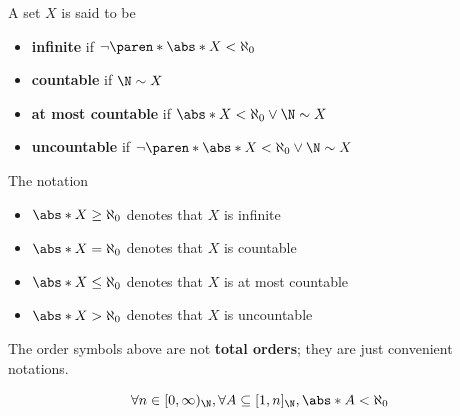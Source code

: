 \begin{definition} \label{an:def:infinite-countable-uncountable-sets}
  A set $X$ is said to be
  \begin{itemize}
    \item \textbf{infinite} if $\neg\paren*{\abs*{X} < \aleph_{0}}$
    \item \textbf{countable} if $\N \sim X$
    \item \textbf{at most countable} if $\abs*{X} < \aleph_{0} \lor \N \sim X$
    \item \textbf{uncountable} if $\neg\paren*{\abs*{X} < \aleph_{0} \lor \N \sim X}$
  \end{itemize}
  The notation
  \begin{itemize}
    \item $\abs*{X} \geq \aleph_{0}$ denotes that $X$ is infinite
    \item $\abs*{X} = \aleph_{0}$ denotes that $X$ is countable
    \item $\abs*{X} \leq \aleph_{0}$ denotes that $X$ is at most countable
    \item $\abs*{X} > \aleph_{0}$ denotes that $X$ is uncountable
  \end{itemize}
  The order symbols above are not \textbf{total orders}; they are just convenient notations.
\end{definition}

\bigskip

\begin{lemma} \label{an:lem:subset-of-Nn-is-finite}
  \[
    \forall n \in [0, \infty)_{\N}, \forall A \subseteq [1, n]_{\N}, \abs*{A} < \aleph_{0}
  \]
\end{lemma}

